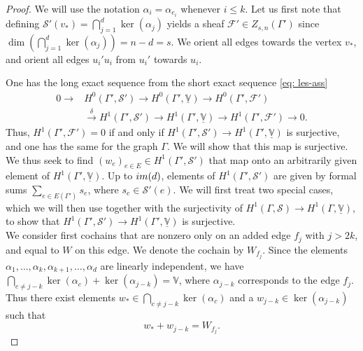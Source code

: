 \documentclass[10pt,a4paper]{amsart}
\newcommand{\im}{\textup{im}}
\begin{document}
\begin{proof}
 We will use the notation $\alpha_{i} = \alpha_{e_i}$ whenever $i\leq k$. Let us first note that defining $\mathcal{S}'(v_*) = \bigcap_{j=1}^{d}  \ker(\alpha_{j})$ yields a sheaf $\mathcal{F}' \in Z_{s, n}(\Gamma')$ since $\dim( \bigcap_{j=1}^{d} \ker(\alpha_{j})) = n - d = s$. We orient all edges towards the vertex $v_*$, and orient all edges $u_i'u_i$ from $u_i'$ towards $u_i$.

One has the long exact sequence from the short exact sequence \eqref{eq: les-ass}
\begin{equation*}
    \begin{array}{cl}
    0 \rightarrow & H^0(\Gamma', \mathcal{S}') \rightarrow H^0(\Gamma', \underline{\mathbb{V}}) \rightarrow H^0(\Gamma', \mathcal{F}') \\[10pt]
    &\xrightarrow{\delta} H^1(\Gamma', \mathcal{S}') \rightarrow H^1(\Gamma', \underline{\mathbb{V}}) \rightarrow H^1(\Gamma', \mathcal{F}') \rightarrow 0.
\end{array}
\end{equation*}
Thus, $H^{1}(\Gamma', \mathcal{F}') = 0$ if and only if $H^1(\Gamma', \mathcal{S}') \rightarrow H^1(\Gamma', \underline{\mathbb{V}})$ is surjective, and one has the same for the graph $\Gamma$. We will show that this map is surjective. We thus seek to find $ (w_{e})_{e \in E} \in H^1(\Gamma', \mathcal{S}')$ that map onto an arbitrarily given element of $H^{1}( \Gamma', \underline{\mathbb{V}})$. Up to $\im(d)$, elements of $H^{1}( \Gamma', \mathcal{S}')$ are given by formal sums $\sum_{e\in E(\Gamma')} s_e$, where $s_e\in \mathcal{S}'(e)$.
We will first treat two special cases, which we will then use together with the surjectivity of $H^{1}(\Gamma, \mathcal{S}) \rightarrow H^{1}(\Gamma, \underline{\mathbb{V}})$, to show that $H^{1}(\Gamma', \mathcal{S}') \rightarrow H^{1}(\Gamma', \underline{\mathbb{V}})$ is surjective.\\
We consider first cochains that are nonzero only on an added edge $f_{j}$ with $j > 2k$, and equal to $W$ on this edge. We denote the cochain by $W_{f_{j}}$. Since the elements $\alpha_{1}, \dots, \alpha_{k}, \alpha_{k+1} , \dots, \alpha_{d}$ are linearly independent, we have $\bigcap_{c \neq j-k} \ker(\alpha_c) + \ker(\alpha_{j-k}) = \mathbb{V}$, where $\alpha_{j-k}$ corresponds to the edge $f_j$. Thus there exist elements $w_{*} \in \bigcap_{c \neq j-k} \ker(\alpha_c)$ and a $w_{j-k} \in \ker(\alpha_{j-k})$ such that 
\begin{equation*}
    w_{*}  + w_{j-k} = W_{f_j}. 

\end{equation*}
\end{proof}
\end{document}
